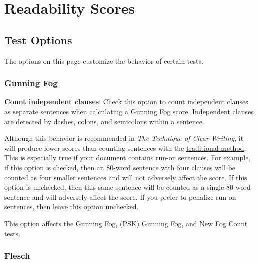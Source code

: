 \documentclass[
]{book}
\theoremstyle{definition}
\theoremstyle{definition}
\theoremstyle{definition}
\theoremstyle{definition}
\theoremstyle{remark}
\begin{document}
\newpage

\hypertarget{readability-test-options}{%
\section{Readability Scores}\label{readability-test-options}}

\hypertarget{options-test-options}{%
\subsection*{Test Options}\label{options-test-options}}

The options on this page customize the behavior of certain tests.

\hypertarget{options-gunning-fog}{%
\subsubsection*{Gunning Fog}\label{options-gunning-fog}}

\textbf{Count independent clauses}: Check this option to count independent clauses as separate sentences when calculating a \protect\hyperlink{gunning-fog-test}{Gunning Fog} score. Independent clauses are detected by dashes, colons, and semicolons within a sentence.

Although this behavior is recommended in \emph{The Technique of Clear Writing}, it will produce lower scores than counting sentences with the \protect\hyperlink{how-sentences-are-counted}{traditional method}. This is especially true if your document contains run-on sentences. For example, if this option is checked, then an 80-word sentence with four clauses will be counted as four smaller sentences and will not adversely affect the score. If this option is unchecked, then this same sentence will be counted as a single 80-word sentence and will adversely affect the score. If you prefer to penalize run-on sentences, then leave this option unchecked.

This option affects the Gunning Fog, (PSK) Gunning Fog, and New Fog Count tests.

\hypertarget{options-flesch}{%
\subsubsection*{Flesch}\label{options-flesch}}
\end{document}
